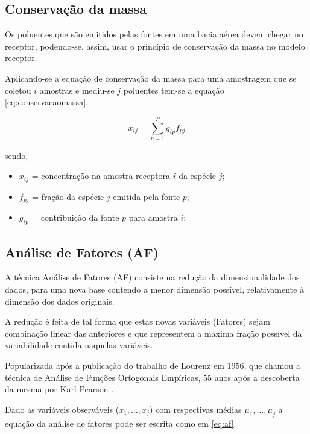 \subsection{Conservação da massa}

Os poluentes que são emitidos pelas fontes em uma bacia aérea devem chegar no 
receptor, podendo-se, assim, usar o princípio de conservação da massa 
no modelo receptor. 

Aplicando-se a equação de conservação da massa para uma amostragem que se 
coletou $i$ amostras e mediu-se $j$ poluentes tem-se a 
equação \ref{eq:conservacaomassa}.

\begin{equation}
  \label{eq:conservacaomassa}
  x_{ij} = \sum_{p=1}^{P} g_{ip}f_{pj} %
\end{equation} 

sendo,
\begin{itemize}
  \item $x_{ij}$ = concentração na amostra receptora $i$ da espécie $j$;
  \item $f_{pj}$ = fração da espécie $j$ emitida pela fonte $p$;
  \item $g_{ip}$ = contribuição da fonte $p$ para amostra $i$;
\end{itemize}

\subsection{Análise de Fatores (AF)}

A técnica Análise de Fatores (AF) consiste na redução da dimensionalidade dos dados, 
para uma nova base contendo a menor dimensão possível, 
relativamente à dimensão dos dados originais.

A redução é feita de tal forma que estas novas variáveis (Fatores) 
sejam combinação linear das anteriores e que representem a máxima fração possível da 
variabilidade contida naquelas variáveis. 

Popularizada após a publicação do trabalho de Lourenz em 1956, que chamou 
a técnica de Análise de Funções Ortogonais Empíricas, 55 anos após a 
descoberta da mesma por Karl Pearson \citep{bartholomew2011}.

Dado as variáveis observáveis ($x_1,\dots,x_j$) com 
respectivas médias $\mu_1,\dots,\mu_j$ a equação da análise de fatores 
pode ser escrita como em \ref{eq:af}. 
 
